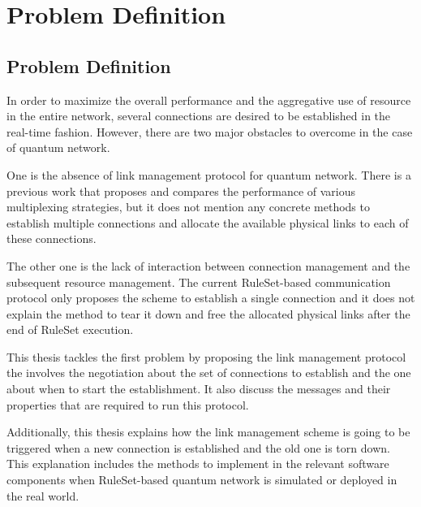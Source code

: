 \chapter{Problem Definition}
\label{problem-definition}

\section{Problem Definition}

In order to maximize the overall performance and the aggregative use of resource in the entire network, several connections are desired to be established in the real-time fashion.
However, there are two major obstacles to overcome in the case of quantum network. 

One is the absence of link management protocol for quantum network. There is a previous work \cite{aparicio2011multiplexing} that proposes and compares the performance of various multiplexing strategies, but it does not mention any concrete methods to establish multiple connections and allocate the available physical links to each of these connections.

The other one is the lack of interaction between connection management and the subsequent resource management. The current RuleSet-based communication protocol \cite{matsuo2019quantum} only proposes the scheme to establish a single connection and it does not explain the method to tear it down and free the allocated physical links after the end of RuleSet execution. 

This thesis tackles the first problem by proposing the link management protocol the involves the negotiation about the set of connections to establish and the one about when to start the establishment. It also discuss the messages and their properties that are required to run this protocol.

Additionally, this thesis explains how the link management scheme is going to be triggered when a new connection is established and the old one is torn down. This explanation includes the methods to implement in the relevant software components when RuleSet-based quantum network is simulated or deployed in the real world.
